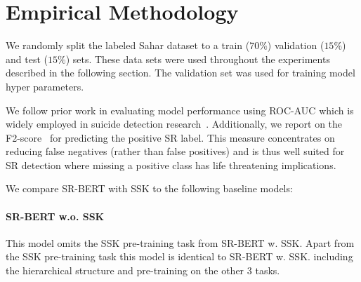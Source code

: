 \documentclass[letterpaper]{article} %
\begin{document}
\section{Empirical Methodology}

We randomly  split   the labeled Sahar dataset  to a train ($70\%$) validation ($15\%$) and test ($15\%$) sets. These data sets were used throughout the experiments described in the following section. The validation set was used for training model hyper parameters.

We follow prior work in evaluating model performance using ROC-AUC which is widely employed in suicide detection research~\cite{bernert2020artificial}. Additionally, we report on the F2-score~\cite{sokolova2006beyond} for predicting the positive SR label. This measure concentrates on reducing false negatives (rather than false positives) and is thus well suited for SR detection where missing a positive class has life threatening implications.




We compare SR-BERT with SSK to the following baseline models:
 
\paragraph{SR-BERT w.o. SSK} This  model omits the SSK pre-training task from SR-BERT w. SSK. Apart from the SSK pre-training task this model is identical to SR-BERT w. SSK. including the hierarchical structure and pre-training on the other 3 tasks. 
\end{document}

